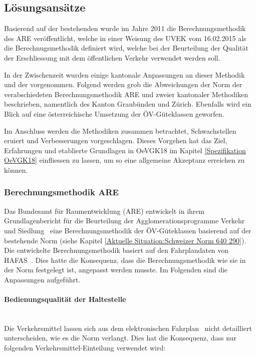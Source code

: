 \subsection{Lösungsansätze}
\label{Stand der Technik:Lösungsansätze}
Basierend auf der bestehenden  wurde im Jahre 2011 die Berechnungsmethodik des \ac{ARE} veröffentlicht, welche in einer Weisung des \acs{UVEK} vom 16.02.2015 als die Berechnugsmethodik definiert wird, welche bei der Beurteilung der Qualität der Erschliessung mit dem öffentlichen Verkehr verwendet werden soll.

In der Zwischenzeit wurden einige kantonale Anpassungen an dieser Methodik und der  vorgenommen.
Folgend werden grob die Abweichungen der Norm der verabschiedeten Berechnungsmethodik ARE und zweier kantonaler Methodiken beschrieben, namentlich des Kanton Graubünden und Zürich.
Ebenfalls wird ein Blick auf eine österreichische Umsetzung der \acs{ÖV}-Güteklassen geworfen.

Im Anschluss werden die Methodiken zusammen betrachtet, Schwachstellen eruiert und Verbesserungen vorgeschlagen.
Dieses Vorgehen hat das Ziel, Erfahrungen und etablierte Grundlagen in \gls{OeVGK18} im Kapitel \ref{Spezifikation OeVGK18} einfliessen zu lassen, um so eine allgemeine Akzeptanz erreichen zu können.

\subsubsection{Berechnungsmethodik ARE}
\label{Lösungsansätze:Berechnungsmethodik ARE}
Das Bundesamt für Raumentwicklung (ARE) entwickelt in ihrem Grundlagenbericht für die Beurteilung der Agglomerationsprogramme Verkehr und Siedlung~\cite{berechnung_are} eine Berechnungsmethodik der \acs{ÖV}-Güteklassen basierend auf der bestehende Norm (siehe Kapitel \ref{Aktuelle Situation:Schweizer Norm 640 290}).
Die entwickelte Berechnungsmethodik basiert auf den Fahrplandaten von HAFAS~\cite{sbb_hafas_spec}.
Dies hatte die Konsequenz, dass die Berechnungsmethodik wie sie in der Norm festgelegt ist, angepasst werden musste.
Im Folgenden sind die Anpassungen aufgeführt.

\paragraph{Bedienungsqualität der Haltestelle}~\\
\label{Berechnungsmethodik ARE:Bedienungsqualität der Haltestelle}
Die Verkehrsmittel lassen sich aus dem elektronischen Fahrplan~\cite{sbb_hafas_spec} nicht detailliert unterscheiden, wie es die Norm verlangt.
Dies hat die Konsequenz, dass nur folgenden Verkehrsmittel-Einteilung verwendet wird:


